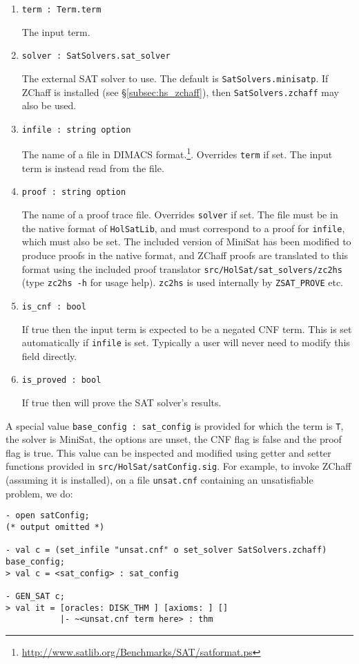 \begin{enumerate}
\item{\texttt{term : Term.term}}

The input term.
\item{\texttt{solver : SatSolvers.sat\_solver}}

The external SAT solver to use. The default is \texttt{SatSolvers.minisatp}. If ZChaff is installed (see \S\ref{subsec:hs_zchaff}), then \texttt{SatSolvers.zchaff} may also be used.
\item{\texttt{infile : string option}}

The name of a file in DIMACS format.\footnote{\url{http://www.satlib.org/Benchmarks/SAT/satformat.ps}}. Overrides \texttt{term} if set. The input term is instead read from the file.
\item{\texttt{proof : string option}}

The name of a proof trace file. Overrides \texttt{solver} if set. The file must be in the native format of {\tt{HolSatLib}}, and must correspond to a proof for \texttt{infile}, which must also be set. The included version of MiniSat has been modified to produce proofs in the native format, and ZChaff proofs are translated to this format using the included proof translator \texttt{src/HolSat/sat\_solvers/zc2hs} (type \texttt{zc2hs -h} for usage help). \texttt{zc2hs} is used internally by \texttt{ZSAT\_PROVE} etc.
\item{\texttt{is\_cnf : bool}}

If true then the input term is expected to be a negated CNF term. This is set automatically if \texttt{infile} is set. Typically a user will never need to modify this field directly.
\item{\texttt{is\_proved : bool}}

If true then \HOL{} will prove the SAT solver's results.
\end{enumerate}

A special value \texttt{base\_config~:~sat\_config} is provided for which the term is \texttt{T}, the solver is MiniSat, the options are unset, the CNF flag is false and the proof flag is true. This value can be inspected and modified using getter and setter functions provided in \texttt{src/HolSat/satConfig.sig}. For example, to invoke ZChaff (assuming it is installed), on a file \texttt{unsat.cnf} containing an unsatisfiable problem, we do:

\begin{session}
\begin{verbatim}
- open satConfig;
(* output omitted *)

- val c = (set_infile "unsat.cnf" o set_solver SatSolvers.zchaff) base_config;
> val c = <sat_config> : sat_config

- GEN_SAT c;
> val it = [oracles: DISK_THM ] [axioms: ] []
           |- ~<unsat.cnf term here> : thm
\end{verbatim}
\end{session}

